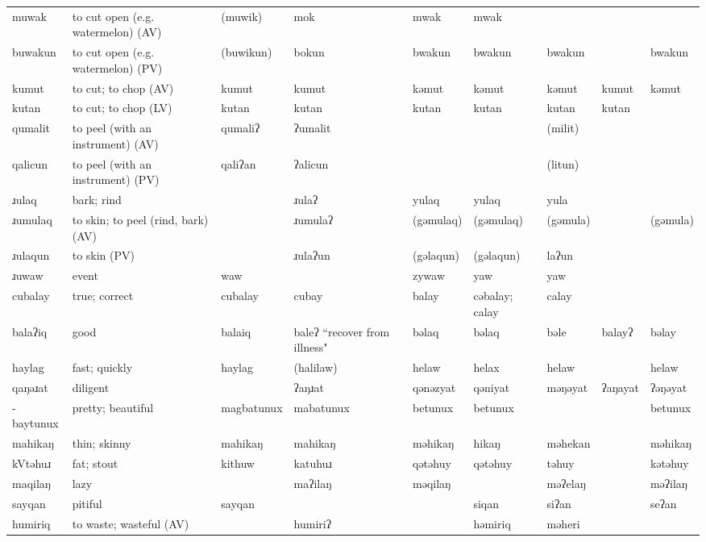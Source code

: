 \begin{landscape}
\begin{longtable}{*{9}{p{}}}
\text{*}muwak & to cut open (e.g. watermelon) (AV) & (muwik) & mok & mwak & mwak &  &  & \\
\text{*}buwakun & to cut open (e.g. watermelon) (PV) & (buwikun) & bokun & bwakun & bwakun & bwakun &  & bwakun\\
\text{*}kumut & to cut; to chop (AV) & kumut & kumut & kəmut & kəmut & kəmut & kumut & kəmut\\
\text{*}kutan & to cut; to chop (LV) & kutan & kutan & kutan & kutan & kutan & kutan & \\
\text{*}qumalit & to peel (with an instrument) (AV) & qumaliʔ & ʔumalit &  &  & (milit) &  & \\
\text{*}qalicun & to peel (with an instrument) (PV) & qaliʔan & ʔalicun &  &  & (litun) &  & \\
\text{*}ɹulaq & bark; rind &  & ɹulaʔ & yulaq & yulaq & yula &  & \\
\text{*}ɹumulaq & to skin; to peel (rind, bark) (AV) &  & ɹumulaʔ & (gəmulaq) & (gəmulaq) & (gəmula) &  & (gəmula)\\
\text{*}ɹulaqun & to skin (PV) &  & ɹulaʔun & (gəlaqun) & (gəlaqun) & laʔun &  & \\
\text{*}ɹuwaw & event & waw &  & zywaw & yaw & yaw &  & \\
\text{*}cubalay & true; correct & cubalay & cubay & balay & cəbalay; calay & calay &  & \\
\text{*}balaʔiq & good & balaiq & baleʔ ``recover from illness" & bəlaq & bəlaq & bəle & balayʔ & bəlay\\
\text{*}haylag & fast; quickly & haylag & (halilaw) & helaw & helax & helaw &  & helaw\\
\text{*}qaŋəɹat & diligent &  & ʔaŋɹat & qənəzyat & qəniyat & məŋəyat & ʔaŋayat & ʔəŋəyat\\
\text{*}-baytunux & pretty; beautiful & magbatunux & mabatunux & betunux & betunux &  &  & betunux\\
\text{*}mahikaŋ & thin; skinny & mahikaŋ & mahikaŋ & məhikaŋ & hikaŋ & məhekan &  & məhikaŋ\\
\text{*}kVtəhuɹ & fat; stout & kithuw & katuhuɹ & qətəhuy & qətəhuy & təhuy &  & kətəhuy\\
\text{*}maqilaŋ & lazy &  & maʔilaŋ & məqilaŋ &  & məʔelaŋ &  & məʔilaŋ\\
\text{*}sayqan & pitiful & sayqan &  &  & siqan & siʔan &  & seʔan\\
\text{*}humiriq & to waste; wasteful (AV) &  & humiriʔ &  & həmiriq & məheri &  & \\

\end{longtable}
\end{landscape}

